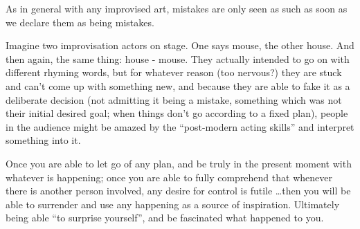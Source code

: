 As in general with any improvised art, mistakes are only seen as such as soon as we declare them as being mistakes.

Imagine two improvisation actors on stage.
One says mouse, the other house.
And then again, the same thing: house - mouse.
They actually intended to go on with different rhyming words, but for whatever reason (too nervous?) they are stuck and can't come up with something new, and because they are able to fake it as a deliberate decision (not admitting it being a mistake, something which was not their initial desired goal; when things don't go according to a fixed plan), people in the audience might be amazed by the ``post-modern acting skills'' and interpret something into it.

Once you are able to let go of any plan, and be truly in the present moment with whatever is happening; once you are able to fully comprehend that whenever there is another person involved, any desire for control is futile \ldots then you will be able to surrender and use any happening as a source of inspiration.
Ultimately being able ``to surprise yourself'', and be fascinated what happened to you.